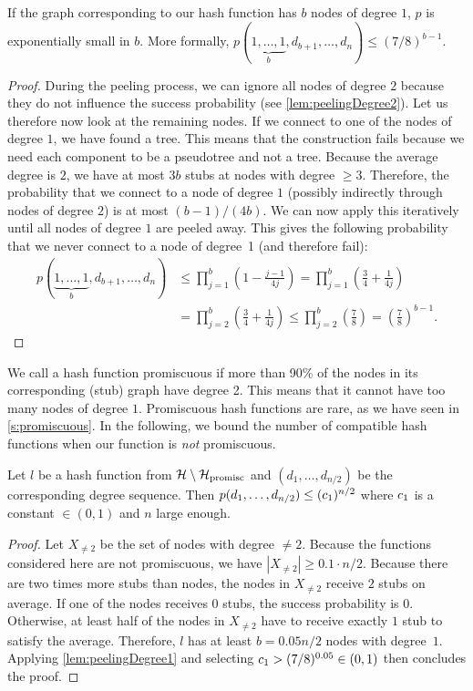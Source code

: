 \documentclass[a4paper,USenglish,cleveref]{lipics-v2021}
\begin{document}
\begin{lemma}
  If the graph corresponding to our hash function has $b$ nodes of degree $1$, $p$ is exponentially small in $b$.
  More formally, $p(\underbrace{1, \ldots, 1}_b, d_{b+1}, \ldots, d_{n}) \leq (7/8)^{b-1}$.
  \label{lem:peelingDegree1}
\end{lemma}
\begin{proof}
  During the peeling process, we can ignore all nodes of degree $2$ because they do not influence the success probability (see \cref{lem:peelingDegree2}).
  Let us therefore now look at the remaining nodes.
  If we connect to one of the nodes of degree $1$, we have found a tree.
  This means that the construction fails because we need each component to be a pseudotree and not a tree.
  Because the average degree is $2$, we have at most $3b$ stubs at nodes with degree $\geq 3$.
  Therefore, the probability that we connect to a node of degree $1$ (possibly indirectly through nodes of degree $2$) is at most $(b-1)/(4b)$.
  We can now apply this iteratively until all nodes of degree $1$ are peeled away.
  This gives the following probability that we never connect to a node of degree~1 (and therefore fail):
  \begin{align*}
    p(\underbrace{1, \ldots, 1}_b, d_{b+1}, \ldots, d_{n})
      &\leq \prod_{j=1}^b\left(1 - \frac{j-1}{4j}\right)
      = \prod_{j=1}^b\left(\frac{3}{4} + \frac{1}{4j}\right) \\
      &= \prod_{j=2}^b\left(\frac{3}{4} + \frac{1}{4j}\right)
      \leq \prod_{j=2}^b\left(\frac{7}{8}\right)
      = \left(\frac{7}{8}\right)^{b-1}.
    \tag*{\qedhere}
  \end{align*}
\end{proof}

We call a hash function promiscuous if more than 90\% of the nodes in its corresponding (stub) graph have degree 2.
This means that it cannot have too many nodes of degree $1$.
Promiscuous hash functions are rare, as we have seen in \cref{s:promiscuous}.
In the following, we bound the number of compatible hash functions when our function is \emph{not} promiscuous.

\begin{lemma}
  Let $l$ be a hash function from $\mathcal{H}\setminus\mathcal{H}_{\textrm{promisc}}$ and $(d_1, \ldots, d_{n/2})$ be the corresponding degree sequence.
  Then $p(d_1, \ldots, d_{n/2}) \leq (c_1)^{n/2}$ where $c_1$ is a constant $\in (0, 1)$ and $n$ large enough.
  \label{lem:nodeDegree1}
\end{lemma}
\begin{proof}
  Let $X_{\not=2}$ be the set of nodes with degree $\not=2$.
  Because the functions considered here are not promiscuous, we have $|X_{\not=2}| \geq 0.1 \cdot n/2$.
  Because there are two times more stubs than nodes, the nodes in $X_{\not=2}$ receive $2$ stubs on average.
  If one of the nodes receives $0$ stubs, the success probability is $0$.
  Otherwise, at least half of the nodes in $X_{\not=2}$ have to receive exactly $1$ stub to satisfy the average.
  Therefore, $l$ has at least $b=0.05n/2$ nodes with degree~$1$.
  Applying \cref{lem:peelingDegree1} and selecting $c_1 > (7/8)^{0.05} \in (0, 1)$ then concludes the proof.
\end{proof}
\end{document}

